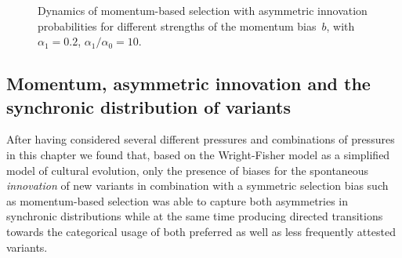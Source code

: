 \begin{knitrout}
\color{fgcolor}\begin{figure}[htbp]

{\centering {}

}

\caption[Dynamics of momentum-based selection with asymmetric innovation.]{Dynamics of momentum-based selection with asymmetric innovation probabilities for different strengths of the momentum bias~$b$, with $\alpha_1=0.2$, $\alpha_1/\alpha_0=10$.}\label{fig:asymmetricmomentumcompletionprobabilities}
\end{figure}


\end{knitrout}

\subsection{Momentum, asymmetric innovation and the synchronic distribution of variants}

After having considered several different pressures and combinations of pressures in this chapter we found that, based on the Wright-Fisher model as a simplified model of cultural evolution, only the presence of biases for the spontaneous \emph{innovation} of new variants in combination with a symmetric selection bias such as momentum-based selection was able to capture both asymmetries in synchronic distributions while at the same time producing directed transitions towards the categorical usage of both preferred as well as less frequently attested variants.

